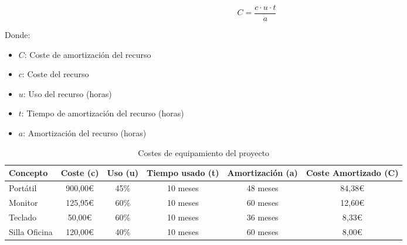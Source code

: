 \begin{equation}
    C = \frac{c \cdot u \cdot t}{a}
    \label{eq:amortizacion}
\end{equation}


Donde:
\begin{itemize}
    \item $C$: Coste de amortización del recurso
    \item $c$: Coste del recurso
    \item $u$: Uso del recurso (horas)
    \item $t$: Tiempo de amortización del recurso (horas)
    \item $a$: Amortización del recurso (horas)
\end{itemize}

\begin{table}[htbp]
    \begin{adjustbox}{max width=\textwidth}
    \centering
    \caption{Costes de equipamiento del proyecto}
    \label{tab:costes_equipamiento}
    \begin{tabular}{@{}lccccc@{}}
    \toprule
    \textbf{Concepto} & \multicolumn{1}{l}{\textbf{Coste (c)}} & \multicolumn{1}{l}{\textbf{Uso (u)}} & \multicolumn{1}{l}{\textbf{Tiempo usado (t)}} & \multicolumn{1}{l}{\textbf{Amortización (a)}} & \multicolumn{1}{l}{\textbf{Coste Amortizado (C)}} \\ \midrule
    Portátil          & 900,00\euro                                & 45\%                                 & 10 meses                                      & 48 meses                                      & 84,38\euro                                            \\
    Monitor           & 125,95\euro                                & 60\%                                 & 10 meses                                      & 60 meses                                      & 12,60\euro                                            \\
    Teclado           & 50,00\euro                                 & 60\%                                 & 10 meses                                      & 36 meses                                      & 8,33\euro                                             \\
    Silla Oficina     & 120,00\euro                                & 40\%                                 & 10 meses                                      & 60 meses                                      & 8,00\euro                                             \\

\end{tabular}
\end{adjustbox}
\end{table}
